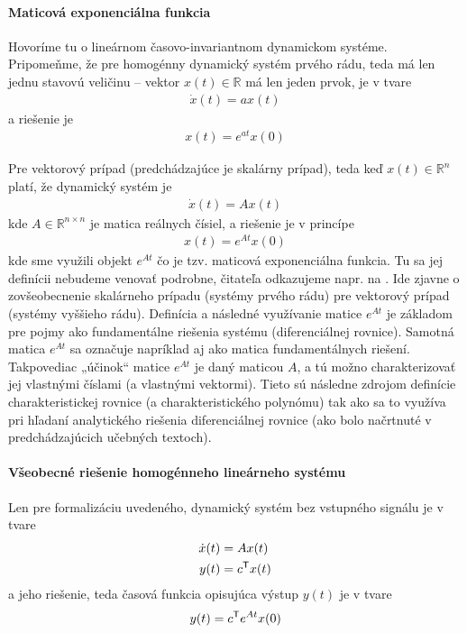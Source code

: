 \documentclass[a4paper, 10pt, ]{article}
\begin{document}
\paragraph{Maticová exponenciálna funkcia}

Hovoríme tu o lineárnom časovo-invariantnom dynamickom systéme. Pripomeňme, že pre homogénny dynamický systém prvého rádu, teda má len jednu stavovú veličinu -- vektor $x(t)\in\mathbb R$ má len jeden prvok, je v tvare
\begin{align}
	\dot x(t) = a x(t)
\end{align}
a riešenie je
\begin{align}
	x(t) = e^{at} x(0)
\end{align}



Pre vektorový prípad (predchádzajúce je skalárny prípad), teda keď $x(t)\in\mathbb R^n$ platí, že dynamický systém je
\begin{align}
	\dot x(t) = A x(t)
\end{align}
kde $A \in\mathbb R^{n\times n}$ je matica reálnych čísiel, a riešenie je v princípe
\begin{align}
	x(t) = e^{At} x(0)
\end{align}
kde sme využili objekt $e^{At}$ čo je tzv. maticová exponenciálna funkcia. Tu sa jej definícii nebudeme venovať podrobne, čitateľa odkazujeme napr. na \cite{AsM08se}. Ide zjavne o zovšeobecnenie skalárneho prípadu (systémy prvého rádu) pre vektorový prípad (systémy vyššieho rádu). Definícia a následné využívanie matice $e^{At}$ je základom pre pojmy ako fundamentálne riešenia systému (diferenciálnej rovnice). Samotná matica $e^{At}$ sa označuje napríklad aj ako matica fundamentálnych riešení. Takpovediac „účinok“ matice $e^{At}$ je daný maticou $A$, a tú možno charakterizovať jej vlastnými číslami (a vlastnými vektormi). Tieto sú následne zdrojom definície charakteristickej rovnice (a charakteristického polynómu) tak ako sa to využíva pri hľadaní analytického riešenia diferenciálnej rovnice (ako bolo načrtnuté v predchádzajúcich učebných textoch).




\paragraph{Všeobecné riešenie homogénneho lineárneho systému}

Len pre formalizáciu uvedeného, dynamický systém bez vstupného signálu je v tvare
\begin{subequations}
\begin{align}
	\dot x(t) &= A x(t) \\
	y(t) &= c^{\mathsf{T}} x(t)
\end{align}
\end{subequations}
a jeho riešenie, teda časová funkcia opisujúca výstup $y(t)$ je v tvare
\begin{align}
	y(t) = c^{\mathsf{T}} e^{At} x(0)
\end{align}
\end{document}
